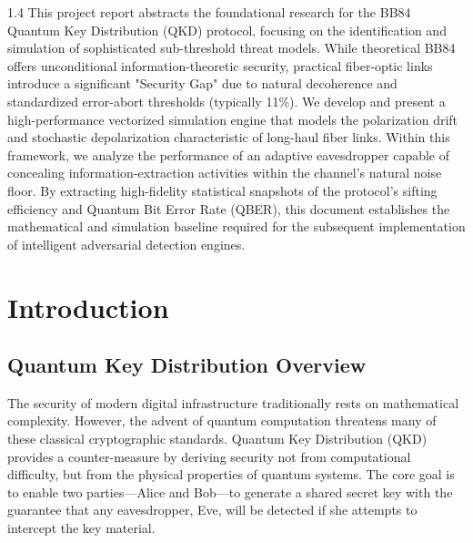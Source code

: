 \documentclass[journal,onecolumn,12pt,draftclsnofoot]{IEEEtran}
\begin{document}
\begin{spacing}{1.4}
\large
This project report abstracts the foundational research for the BB84 Quantum Key Distribution (QKD) protocol, focusing on the identification and simulation of sophisticated sub-threshold threat models. While theoretical BB84 offers unconditional information-theoretic security, practical fiber-optic links introduce a significant "Security Gap" due to natural decoherence and standardized error-abort thresholds (typically 11\%). We develop and present a high-performance vectorized simulation engine that models the polarization drift and stochastic depolarization characteristic of long-haul fiber links. Within this framework, we analyze the performance of an adaptive eavesdropper capable of concealing information-extraction activities within the channel's natural noise floor. By extracting high-fidelity statistical snapshots of the protocol's sifting efficiency and Quantum Bit Error Rate (QBER), this document establishes the mathematical and simulation baseline required for the subsequent implementation of intelligent adversarial detection engines.
\end{spacing}

\newpage

\tableofcontents
\newpage


\section{Introduction}

\subsection{Quantum Key Distribution Overview}
The security of modern digital infrastructure traditionally rests on mathematical complexity. However, the advent of quantum computation threatens many of these classical cryptographic standards. Quantum Key Distribution (QKD) provides a counter-measure by deriving security not from computational difficulty, but from the physical properties of quantum systems. The core goal is to enable two parties—Alice and Bob—to generate a shared secret key with the guarantee that any eavesdropper, Eve, will be detected if she attempts to intercept the key material.
\end{document}
